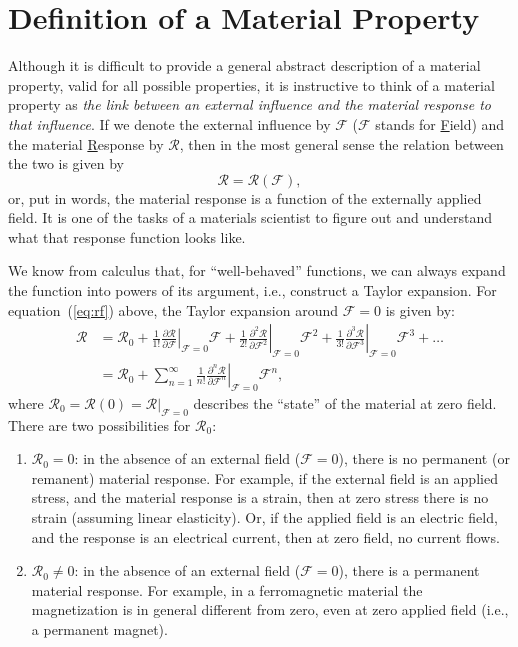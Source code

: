 \section{Definition of a Material Property\label{sec:matprop}}

Although it is difficult to provide a general abstract description of a material property, valid for all possible properties, it is instructive to think of a material property as \textit{the link between an external influence and the material response to that influence}.  If we denote the external influence by $\mathcal{F}$ ($\mathcal{F}$ stands for \underline{F}ield) and the material \underline{R}esponse by $\mathcal{R}$, then in the most general sense the relation between the two is given by
\begin{equation}
	\mathcal{R}=\mathcal{R}(\mathcal{F}),\label{eq:rf}
\end{equation}
or, put in words, the material response is a function of the externally applied field.  It is one of the tasks of a materials scientist to figure out and understand what that response function looks like.

We know from calculus that, for ``well-behaved'' functions, we can always expand the function into powers of its argument, i.e., construct a Taylor expansion.  For equation~(\ref{eq:rf}) above, the Taylor expansion around $\mathcal{F}=0$ is given by:
\begin{align}
	\mathcal{R}&=\mathcal{R}_0 + 
	\frac{1}{1!}\left.\frac{\partial\mathcal{R}}{\partial\mathcal{F}}\right 
	\vert_{\mathcal{F}=0}\!\!\!\!\mathcal{F} + 
	\frac{1}{2!}\left.\frac{\partial^2\mathcal{R}}{\partial\mathcal{F}^2}\right 
	\vert_{\mathcal{F}=0}\!\!\!\!\mathcal{F}^2 + 
	\frac{1}{3!}\left.\frac{\partial^3\mathcal{R}}{\partial\mathcal{F}^3}\right 
	\vert_{\mathcal{F}=0}\!\!\!\!\mathcal{F}^3 + \ldots \nonumber\\
	&= \mathcal{R}_0 +
	\sum_{n=1}^{\infty}\frac{1}{n!}\left.\frac{\partial^n\mathcal{R}}{\partial\mathcal{F}^n}\right 
	\vert_{\mathcal{F}=0}\!\!\!\!\mathcal{F}^n,
	\label{eq:expansion}
\end{align}
where $\mathcal{R}_0 = \mathcal{R}(0)=\mathcal{R}\vert_{\mathcal{F}=0}$ describes the ``state'' of the material at zero field.  There are two possibilities for $\mathcal{R}_0$:
\begin{enumerate}
	\item $\mathcal{R}_0=0$: in the absence of an external field ($\mathcal{F}=0$), there is no permanent (or remanent) material response.  For example, if the external field is an applied stress, and the material response is a strain, then at zero stress there is no strain (assuming linear elasticity).  Or, if the applied field is an electric field, and the response is an electrical current, then at zero field, no current flows.
	
	\item $\mathcal{R}_0\neq 0$: in the absence of an external field ($\mathcal{F}=0$), there is a permanent material response.  For example, in a ferromagnetic material the magnetization is in general different from zero, even at zero applied field (i.e., a permanent magnet).  
\end{enumerate}

